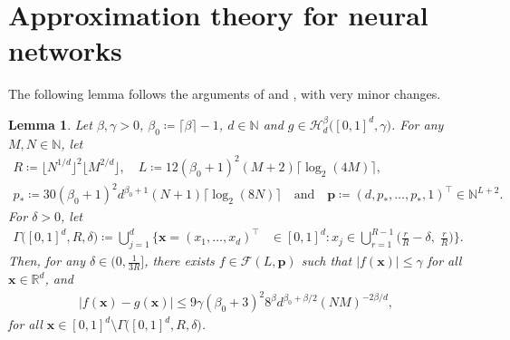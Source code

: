 \documentclass[12pt]{article}
\newtheorem{lemma}[thm]{Lemma}
\begin{document}
\section{Approximation theory for neural networks}
The following lemma follows the arguments of \citet[Theorem~2.2]{lu2021deep} and \citet[Theorem~3.3]{jiao2023deep}, with very minor changes.
\begin{lemma} \label{lemma:approximate-holder-functions-[0,1]^d}
    Let $\beta,\gamma>0$, $\beta_0 \coloneqq \lceil\beta\rceil - 1$, $d\in\mathbb{N}$ and $g \in \mathcal{H}_d^{\beta}\bigl([0,1]^d,\gamma\bigr)$. For any $M,N \in \mathbb{N}$, let
    \begin{gather*}
        R \coloneqq \lfloor N^{1/d} \rfloor^2 \lfloor M^{2/d}\rfloor,\quad L\coloneqq 12(\beta_0+1)^2(M+2)\lceil \log_2(4M) \rceil,\\
        p_* \coloneqq 30(\beta_0+1)^2 d^{\beta_0+1} (N+1) \lceil\log_2(8N)\rceil \quad\text{and}\quad \bm p \coloneqq (d,p_*,\ldots,p_*,1)^\top \in \mathbb{N}^{L+2}.
    \end{gather*}
    For $\delta > 0$, let 
    \begin{align*}
        \Gamma\bigl( [0,1]^d, R, \delta \bigr) \coloneqq \bigcup_{j=1}^d \biggl\{ \bm x = (x_1,\ldots,x_d)^\top &\in [0,1]^d : x_j \in \bigcup_{r=1}^{R-1} \biggl( \frac{r}{R} - \delta,\; \frac{r}{R} \biggr) \biggr\}.
    \end{align*}
    Then, for any $\delta \in \bigl(0, \frac{1}{3R}\bigr]$, there exists $f\in\mathcal{F}(L,\bm p)$ such that $|f(\bm x)| \leq \gamma$ for all $\bm x \in \mathbb{R}^d$, and
    \begin{align*}
        |f(\bm x) - g(\bm x)| \leq 9\gamma (\beta_0+3)^2 8^{\beta} d^{\beta_0+\beta/2} (NM)^{-2\beta/d},
    \end{align*}
    for all $\bm x \in [0,1]^d \setminus \Gamma\bigl( [0,1]^d, R, \delta \bigr)$.    
\end{lemma}
\end{document}
